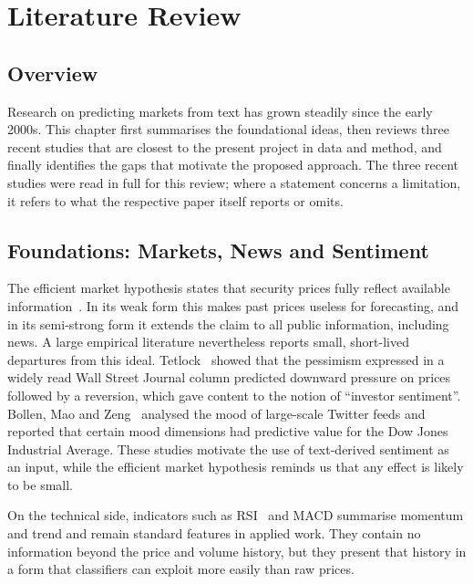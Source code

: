\chapter{Literature Review}

\section{Overview}
Research on predicting markets from text has grown steadily since the early 2000s. This chapter first summarises the foundational ideas, then reviews three recent studies that are closest to the present project in data and method, and finally identifies the gaps that motivate the proposed approach. The three recent studies were read in full for this review; where a statement concerns a limitation, it refers to what the respective paper itself reports or omits.

\section{Foundations: Markets, News and Sentiment}
The efficient market hypothesis states that security prices fully reflect available information~\cite{fama1970efficient}. In its weak form this makes past prices useless for forecasting, and in its semi-strong form it extends the claim to all public information, including news. A large empirical literature nevertheless reports small, short-lived departures from this ideal. Tetlock~\cite{tetlock2007giving} showed that the pessimism expressed in a widely read Wall Street Journal column predicted downward pressure on prices followed by a reversion, which gave content to the notion of ``investor sentiment''. Bollen, Mao and Zeng~\cite{bollen2011twitter} analysed the mood of large-scale Twitter feeds and reported that certain mood dimensions had predictive value for the Dow Jones Industrial Average. These studies motivate the use of text-derived sentiment as an input, while the efficient market hypothesis reminds us that any effect is likely to be small.

On the technical side, indicators such as RSI~\cite{wilder1978new} and MACD summarise momentum and trend and remain standard features in applied work. They contain no information beyond the price and volume history, but they present that history in a form that classifiers can exploit more easily than raw prices.

